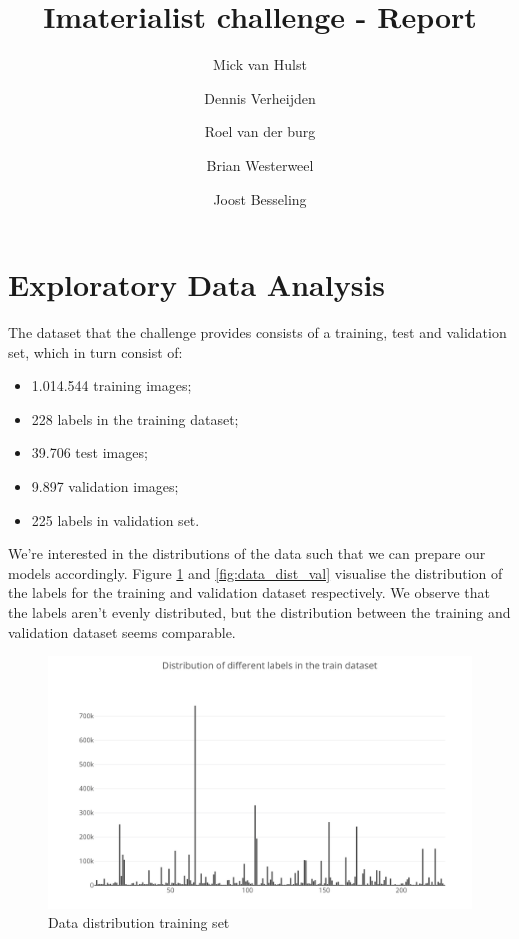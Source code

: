 \documentclass[10pt, a4paper]{article}
\title{Imaterialist challenge - Report}
\author{Mick van Hulst \and Dennis Verheijden \and Roel van der burg \and Brian Westerweel \and Joost Besseling}
\begin{document}
    \maketitle
    \section{Exploratory Data Analysis}
    The dataset that the challenge provides consists of a training, test and validation set, which in turn consist of: 
    \begin{itemize}
        \item 1.014.544 training images;
        \item 228 labels in the training dataset;
        \item 39.706 test images;
        \item 9.897 validation images;
        \item 225 labels in validation set.
    \end{itemize}
    We're interested in the distributions of the data such that we can prepare our models accordingly. Figure \ref{fig:data_dist_train} and \ref{fig:data_dist_val} visualise the distribution of the labels for the training and validation dataset respectively. We observe that the labels aren't evenly distributed, but the distribution between the training and validation dataset seems comparable.
	\begin{figure}[H]
        \centering
        \includegraphics[scale=.4]{img_imaterialist/dist_labels_train.png}
        \caption{Data distribution training set}
        \label{fig:data_dist_train}
    \end{figure}
\end{document}
